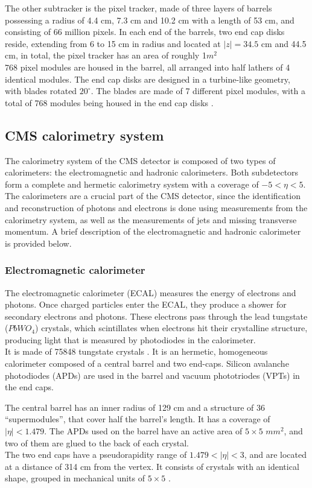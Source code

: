 The other subtracker is the pixel tracker, made of three layers of barrels possessing a radius of 4.4 cm, 7.3 cm and 10.2 cm with a length of  53 cm, and consisting of 66 million pixels.  In each end of the barrels, two  end cap disks reside, extending from 6 to 15 cm in radius and located at $|z|=34.5$ cm and 44.5 cm, in total, the pixel tracker has an area of roughly 1$m^2$\\
768 pixel modules are housed in the barrel, all arranged into half lathers of 4 identical modules. The end cap disks are designed in a turbine-like geometry, with blades rotated $20^{\circ}$. The blades are made of 7 different pixel modules, with a total of 768 modules being housed in the end cap disks \cite{cms-manual}.
\subsection{CMS calorimetry system}
The calorimetry system of the CMS detector is composed of two types of calorimeters: the electromagnetic and hadronic calorimeters. Both subdetectors form a complete and hermetic calorimetry system with a coverage of $-5<\eta<5$. The calorimeters are a crucial part of the CMS detector, since the identification and reconstruction of photons and electrons is done using measurements from the calorimetry system, as well as the measurements of jets and missing transverse momentum. A brief description of the electromagnetic and hadronic calorimeter is provided below.

\subsubsection*{Electromagnetic calorimeter}
The electromagnetic calorimeter (ECAL) measures the energy of electrons and photons. Once charged particles enter the ECAL, they produce a shower for secondary electrons and photons. These electrons pass through the lead tungstate ($PbWO_4$) crystals, which scintillates when electrons hit their crystalline structure, producing light that is measured by photodiodes in the calorimeter.\\
It is made of 75848 tungstate crystals \cite{Contardo:2020886}. It is an hermetic, homogeneous calorimeter composed of a central barrel and two end-caps. Silicon avalanche photodiodes (APDs) are used in the barrel and vacuum phototriodes (VPTs) in the end caps.

The central barrel has an inner radius of 129 cm and a structure of 36 “supermodules”, that cover half the barrel's length. It has a coverage of $|\eta|<1.479$. The APDs used on the barrel have an active area of $5\times5$ $mm^2$, and two of them are glued to the back of each crystal.\\
The two end caps have a pseudorapidity range of $1.479<|\eta|<3$, and are located at a distance of 314 cm from the vertex. It consists of crystals with an identical shape,  grouped in mechanical units of $5\times 5$ \cite{cms-manual}.
